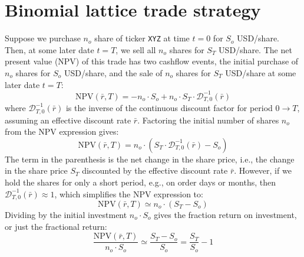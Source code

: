 \documentclass[11pt]{article}
\makeatletter
\theoremstyle{definition}
\renewcommand\subsubsection{\@startsection
	{subsubsection}{2}{0mm}
	{-0.05in}
	{-0.5\baselineskip}
	{\normalfont\normalsize\itshape\bfseries}}
\makeatother
\begin{document}

\section*{Binomial lattice trade strategy}
Suppose we purchase $n_{o}$ share of ticker \texttt{XYZ} at time $t=0$ for $S_{o}$ USD/share.
Then, at some later date $t=T$, we sell all $n_{o}$ shares for $S_{T}$ USD/share. 
The net present value (NPV) of this trade has two cashflow events, the initial purchase of $n_{o}$ shares for $S_{o}$ USD/share,
and the sale of $n_{o}$ shares for $S_{T}$ USD/share at some later date $t=T$:
\begin{equation*}
\text{NPV}(\bar{r},T) = -n_{o}\cdot{S_{o}} + n_{o}\cdot{S_{T}}\cdot\mathcal{D}_{T,0}^{-1}(\bar{r})
\end{equation*}
where $\mathcal{D}_{T,0}^{-1}(\bar{r})$ is the inverse of the continuous discount factor 
for period $0\rightarrow{T}$, assuming an effective discount rate $\bar{r}$. 
Factoring the initial number of shares $n_{o}$ from the NPV expression gives:
\begin{equation*}
\text{NPV}(\bar{r},T) = n_{o}\cdot\left(S_{T}\cdot\mathcal{D}_{T,0}^{-1}(\bar{r}) - S_{o}\right)
\end{equation*}
The term in the parenthesis is the net change in the share price, i.e., the change in the share price $S_{T}$ discounted by the effective discount rate $\bar{r}$.
However, if we hold the shares for only a short period, e.g., on order days or months, then $\mathcal{D}_{T,0}^{-1}(\bar{r})\approx{1}$, which
simplifies the NPV expression to:
\begin{equation*}
\text{NPV}(\bar{r}, T) \simeq n_{o}\cdot(S_{T}-S_{o})
\end{equation*}
Dividing by the initial investment $n_{o}\cdot{S_{o}}$ gives the fraction return on investment, or just the fractional return:
\begin{equation}\label{eqn:roi-fractional-return}
\frac{\text{NPV}(\bar{r}, T)}{n_{o}\cdot{S_{o}}} \simeq \frac{S_{T}-S_{o}}{S_{o}} = \frac{S_{T}}{S_{o}} - 1
\end{equation}
\end{document}
